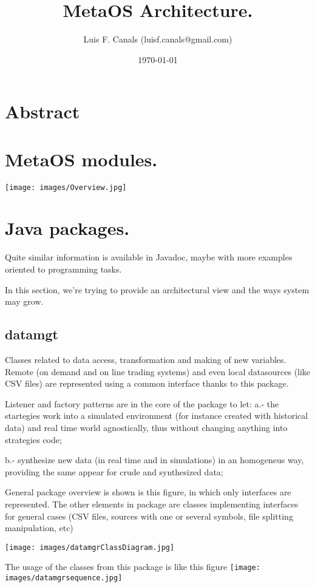 \documentclass[11pt,a4paper]{article}
\title{MetaOS Architecture.}
\author{Luis F. Canals (luisf.canals@gmail.com)}
\begin{document}
\date{\today}
\maketitle


\section{Abstract}

\section{MetaOS modules.}

\texttt{[image: images/Overview.jpg]}

\section{Java packages.}
Quite similar information is available in Javadoc, maybe with more 
examples oriented to programming tasks.

In this section, we're trying to provide an architectural view 
and the ways system may grow.


\subsection{datamgt}
Classes related to data access, transformation and making of new variables.
Remote (on demand and on line trading systems) and even local datasources 
(like CSV files) are represented using a common interface thanks to 
this package.

Listener and factory patterns are in the core of the package to let:
    a.- the startegies work into a simulated environment (for instance
        created with historical data) and real time world agnostically,
        thus without changing anything into strategies code;

    b.- synthesize new data (in real time and in simulations) in an homogeneus
        way, providing the same appear for crude and synthesized data;

General package overview is shown is this figure, in which only interfaces
are represented. The other elements in package are classes implementing
interfaces for general cases (CSV files, sources with one or several symbols,
file splitting manipulation, etc)

\texttt{[image: images/datamgrClassDiagram.jpg]}

The usage of the classes from this package is like this figure
\texttt{[image: images/datamgrsequence.jpg]}
\end{document}
